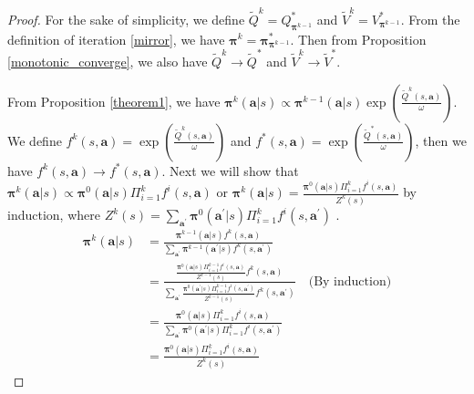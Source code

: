 \documentclass{article}
\begin{document}
	\begin{proof}
	    For the sake of simplicity, we define $\tilde{Q}^{k} = Q^*_{\bm{\pi}^{k - 1}}$ and $\tilde{V}^{k} = V^*_{\bm{\pi}^{k - 1}}$. From the definition of iteration \eqref{mirror}, we have $\bm{\pi}^k = \bm{\pi}^*_{\bm{\pi}^{k-1}}$. Then from Proposition \ref{monotonic_converge}, we also have $\tilde{Q}^{k} \to \tilde{Q}^{*}$ and $\tilde{V}^{k} \to \tilde{V}^{*}$.
	    
	    From Proposition \ref{theorem1}, we have $\bm{\pi}^k(\bm{a}|s) \propto \bm{\pi}^{k-1}(\bm{a}|s) \exp(\frac{\tilde{Q}^k(s,\bm{a})}{\omega})$. We define $f^k(s,\bm{a}) = \exp(\frac{\tilde{Q}^k(s,\bm{a})}{\omega})$ and $f^*(s,\bm{a}) = \exp(\frac{\tilde{Q}^*(s,\bm{a})}{\omega})$, then we have $f^k(s,\bm{a}) \to f^*(s,\bm{a})$. Next we will show that $\bm{\pi}^k(\bm{a}|s) \propto \bm{\pi}^{0}(\bm{a}|s) \Pi_{i = 1}^k f^i(s,\bm{a}) $ or $\bm{\pi}^k(\bm{a}|s) = \frac{\bm{\pi}^{0}(\bm{a}|s) \Pi_{i = 1}^k f^i(s,\bm{a})}{Z^k(s)}$ by induction, where $Z^k(s) = \sum_{\bm{a}^\prime} \bm{\pi}^{0}(\bm{a}^\prime|s) \Pi_{i = 1}^k f^i(s,\bm{a}^\prime) $ . 
	    \begin{align*}
	        \bm{\pi}^k(\bm{a}|s) & = \frac{\bm{\pi}^{k-1}(\bm{a}|s)f^k(s,\bm{a})}{\sum_{\bm{a}^\prime}\bm{\pi}^{k-1}(\bm{a}^\prime|s)f^k(s,\bm{a}^\prime) } \\
	        & = \frac{  \frac{\bm{\pi}^{0}(\bm{a}|s) \Pi_{i = 1}^{k-1} f^i(s,\bm{a})}{Z^{k -1}(s)}f^k(s,\bm{a})}{\sum_{\bm{a}^\prime}\frac{\bm{\pi}^{0}(\bm{a}^\prime|s) \Pi_{i = 1}^{k-1} f^i(s,\bm{a}^\prime)}{Z^{k -1}(s)}f^k(s,\bm{a}^\prime) } \quad \text{(By induction)} \\
	        & = \frac{  \bm{\pi}^{0}(\bm{a}|s) \Pi_{i = 1}^{k}f^i(s,\bm{a}) }{\sum_{\bm{a}^\prime} \bm{\pi}^{0}(\bm{a}^\prime|s) \Pi_{i = 1}^{k}f^i(s,\bm{a}^\prime) } \\
	        & = \frac{ \bm{\pi}^{0}(\bm{a}|s) \Pi_{i = 1}^{k}f^i(s,\bm{a})}{Z^k(s)}
	    \end{align*}
	    

\end{proof}
\end{document}
